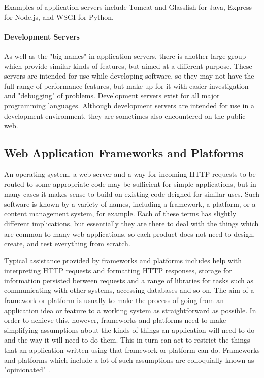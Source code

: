 Examples of application servers include Tomcat  and Glassfish  for Java, Express for Node.js, and WSGI  for Python.

\paragraph{Development Servers}
As well as the "big names" in application servers, there is another large group which provide similar kinds of features, but aimed at a different purpose. These servers are intended for use while developing software, so they may not have the full range of performance features, but make up for it with easier investigation and "debugging" of problems. Development servers exist for all major programming languages. Although development servers are intended for use in a development environment, they are sometimes also encountered on the public web.

\subsection{Web Application Frameworks and Platforms}
An operating system, a web server and a way for incoming HTTP requests to be routed to some appropriate code may be sufficient for simple applications, but in many cases it makes sense to build on existing code deigned for similar uses. Such software is known by a variety of names, including a framework, a platform, or a content management system, for example. Each of these terms has slightly different implications, but essentially they are there to deal with the things which are common to many web applications, so each product does not need to design, create, and test everything from scratch.

Typical assistance provided by frameworks and platforms includes  help with interpreting HTTP requests and formatting HTTP responses, storage for information persisted between requests and a range of libraries for tasks such as communicating with other systems, accessing databases and so on. The aim of a framework or platform is usually to make the process of going from an application idea or feature to a working system as straightforward as possible. In order to achieve this, however, frameworks and platforms need to make simplifying assumptions about the kinds of things an application will need to do and the way it will need to do them. This in turn can act to restrict the things that an application written using that framework or platform can do. Frameworks and platforms which include a lot of such assumptions are colloquially known as "opinionated" .

